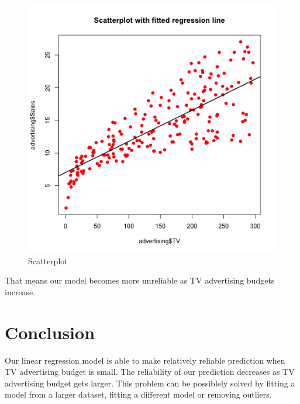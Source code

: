 \documentclass{article}
\begin{document}
\begin{figure}[H]
\centering
\includegraphics{../images/scatterplot-tv-sales.png}
\caption{\label{fig:scatter} Scatterplot}
\end{figure}

\noindent
That means our model becomes more unreliable as TV advertising budgets increase.

\section{Conclusion}
Our linear regression model is able to make relatively reliable prediction when TV advertising budget is small. The reliability of our prediction decreases as TV advertising budget gets larger. This problem can be possiblely solved by fitting a model from a larger dataset, fitting a different model or removing outliers.
\end{document}
